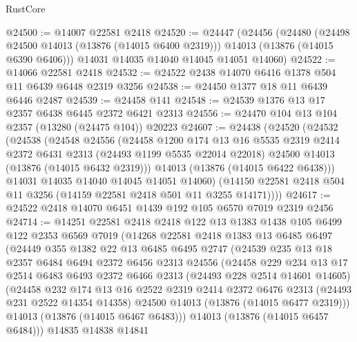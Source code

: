\begin{lexlean}{RustCore}
\begin{coremodule}
@24500 := @14007 @22581 @2418
@24520 := @24447
    (@24456
      (@24480
        (@24498 @24500 @14013 (@13876 (@14015 @6400 @2319)))
        @14013
        (@13876 (@14015 @6390 @6406)))
      @14031
      @14035
      @14040
      @14045
      @14051
      @14060)
@24522 := @14066 @22581 @2418
@24532 := @24522 @2438 @14070 @6416 @1378 @504 @11 @6439 @6448 @2319 @3256
@24538 := @24450 @1377 @18 @11 @6439 @6446 @2487
@24539 := @24458 @141
@24548 := @24539 @1376 @13 @17 @2357 @6438 @6445 @2372 @6421 @2313
@24556 := @24470 @104 @13 @104 @2357 (@13280 (@24475 @104)) @20223
@24607 := @24438
    (@24520
      (@24532
        (@24538
          (@24548
            @24556
            (@24458
              @1200
              @174
              @13
              @16
              @5535
              @2319
              @2414
              @2372
              @6431
              @2313
              (@24493 @1199 @5535 @22014 @22018)
              @24500
              @14013
              (@13876 (@14015 @6432 @2319)))
            @14013
            (@13876 (@14015 @6422 @6438)))
          @14031
          @14035
          @14040
          @14045
          @14051
          @14060)
        (@14150 @22581 @2418 @504 @11 @3256 (@14159 @22581 @2418 @501 @11 @3255 @14171))))
@24617 := @24522 @2418 @14070 @6451 @1439 @192 @105 @6570 @7019 @2319 @2456
@24714 := @14251
    @22581
    @2418
    @2418
    @122
    @13
    @1383
    @1438
    @105
    @6499
    @122
    @2353
    @6569
    @7019
    (@14268
      @22581
      @2418
      @1383
      @13
      @6485
      @6497
      (@24449
        @355
        @1382
        @22
        @13
        @6485
        @6495
        @2747
        (@24539
          @235
          @13
          @18
          @2357
          @6484
          @6494
          @2372
          @6456
          @2313
          @24556
          (@24458
            @229
            @234
            @13
            @17
            @2514
            @6483
            @6493
            @2372
            @6466
            @2313
            (@24493 @228 @2514 @14601 @14605)
            (@24458
              @232
              @174
              @13
              @16
              @2522
              @2319
              @2414
              @2372
              @6476
              @2313
              (@24493 @231 @2522 @14354 @14358)
              @24500
              @14013
              (@13876 (@14015 @6477 @2319)))
            @14013
            (@13876 (@14015 @6467 @6483)))
          @14013
          (@13876 (@14015 @6457 @6484)))
        @14835
        @14838
        @14841

\end{coremodule}
\end{lexlean}
